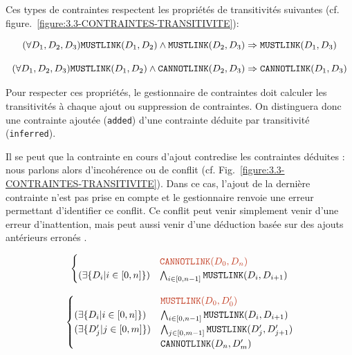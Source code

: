 		Ces types de contraintes respectent les propriétés de transitivités suivantes (cf. figure.~\ref{figure:3.3-CONTRAINTES-TRANSITIVITE}):
		
		\begin{equation}
			(\forall D_1,D_2,D_3) \\
			\texttt{MUSTLINK}(D_1,D_2) \wedge \texttt{MUSTLINK}(D_2,D_3)
			\Rightarrow \texttt{MUSTLINK}(D_1,D_3)
		\end{equation}
		
		\begin{equation}
			(\forall D_1,D_2,D_3) \\
			\texttt{MUSTLINK}(D_1,D_2) \wedge \texttt{CANNOTLINK}(D_2,D_3)
			\Rightarrow \texttt{CANNOTLINK}(D_1,D_3)
		\end{equation}
		
		Pour respecter ces propriétés, le gestionnaire de contraintes doit calculer les transitivités à chaque ajout ou suppression de contraintes. On distinguera donc une contrainte ajoutée (\texttt{added}) d'une contrainte déduite par transitivité (\texttt{inferred}).
		
		Il se peut que la contrainte en cours d'ajout contredise les contraintes déduites : nous parlons alors d'incohérence ou de conflit (cf. Fig.~\ref{figure:3.3-CONTRAINTES-TRANSITIVITE}). Dans ce cas, l'ajout de la dernière contrainte n'est pas prise en compte et le gestionnaire renvoie une erreur permettant d'identifier ce conflit.
		Ce conflit peut venir simplement venir d'une erreur d’inattention, mais peut aussi venir d'une déduction basée sur des ajouts antérieurs erronés .
		
		\begin{equation}
			\begin{cases}
				& \textcolor{colorDarkPastelRed}{\texttt{CANNOTLINK}(D_0,D_n)} \\
				(\exists \{D_i | i\in[0,n]\})
				& \bigwedge_{i\in[0,n-1]} \texttt{MUSTLINK}(D_i,D_{i+1})
			\end{cases}
		\end{equation}
		
		\begin{equation}
			\begin{cases}
				& \textcolor{colorDarkPastelRed}{\texttt{MUSTLINK}(D_0,D'_0)} \\
				(\exists \{D_i | i\in[0,n]\})
				& \bigwedge_{i\in[0,n-1]} \texttt{MUSTLINK}(D_i,D_{i+1})\\
				(\exists \{D'_j | j\in[0,m]\})
				& \bigwedge_{j\in[0,m-1]} \texttt{MUSTLINK}(D'_j,D'_{j+1})\\
				& \texttt{CANNOTLINK}(D_n,D'_m)
			\end{cases}
		\end{equation}
		
